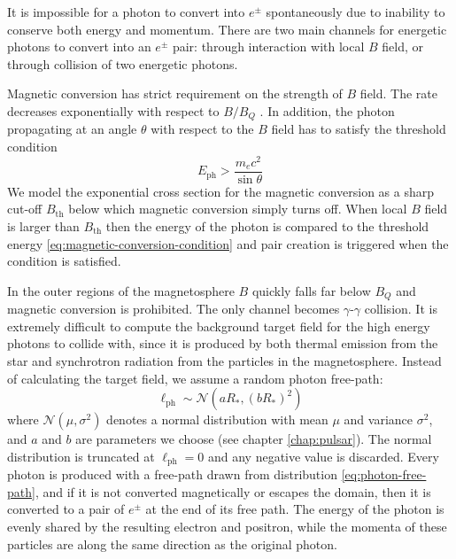 It is impossible for a photon to convert into $e^{\pm}$ spontaneously due to
inability to conserve both energy and momentum. There are two main channels for
energetic photons to convert into an $e^{\pm}$ pair: through interaction with
local $B$ field, or through collision of two energetic photons.

Magnetic conversion has strict requirement on the strength of $B$ field. The
rate decreases exponentially with respect to $B/B_{Q}$
\citep{erber_high-energy_1966}. In addition, the photon propagating at an angle
$\theta$ with respect to the $B$ field has to satisfy the threshold condition
\begin{equation}
  \label{eq:magnetic-conversion-condition}
  E_\mathrm{ph} > \frac{m_{e}c^2}{\sin\theta}
\end{equation}
We model the exponential cross section for the magnetic conversion as a sharp
cut-off $B_\mathrm{th}$ below which magnetic conversion simply turns off. When
local $B$ field is larger than $B_\mathrm{th}$ then the energy of the photon is
compared to the threshold energy \eqref{eq:magnetic-conversion-condition} and
pair creation is triggered when the condition is satisfied.

In the outer regions of the magnetosphere $B$ quickly falls far below $B_{Q}$
and magnetic conversion is prohibited. The only channel becomes
$\gamma$-$\gamma$ collision. It is extremely difficult to compute the background
target field for the high energy photons to collide with, since it is produced
by both thermal emission from the star and synchrotron radiation from the
particles in the magnetosphere. Instead of calculating the target field, we
assume a random photon free-path:
\begin{equation}
  \label{eq:photon-free-path}
  \ell_\mathrm{ph} \sim \mathcal{N}(aR_{*}, (bR_{*})^2)
\end{equation}
where $\mathcal{N}(\mu, \sigma^2)$ denotes a normal distribution with mean $\mu$
and variance $\sigma^2$, and $a$ and $b$ are parameters we choose (see chapter
\ref{chap:pulsar}). The normal distribution is truncated at $\ell_\mathrm{ph} =
0$ and any negative value is discarded. Every photon is produced with a
free-path drawn from distribution \ref{eq:photon-free-path}, and if it is not
converted magnetically or escapes the domain, then it is converted to a pair of
$e^{\pm}$ at the end of its free path. The energy of the photon is evenly shared
by the resulting electron and positron, while the momenta of these particles are
along the same direction as the original photon.

